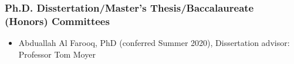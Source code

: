 \hypertarget{thesis-committees}{%
\subsubsection{Ph.D. Disstertation/Master's Thesis/Baccalaureate (Honors) Committees}\label{thesis-committees}}
\begin{itemize}
\item Abduallah Al Farooq, PhD (conferred Summer 2020), Dissertation advisor: Professor Tom Moyer
\end{itemize}

